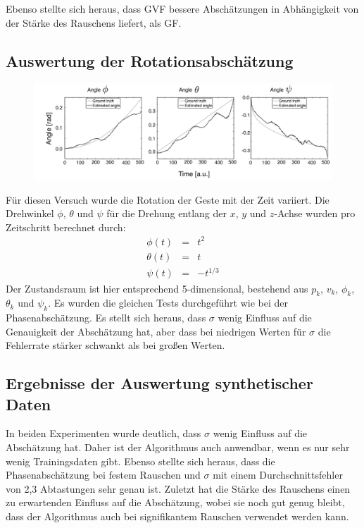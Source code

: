 \documentclass{llncs}
\begin{document}
Ebenso stellte sich heraus, dass GVF bessere Abschätzungen in Abhängigkeit von der Stärke des Rauschens liefert, als GF.

\subsection{Auswertung der Rotationsabschätzung}
\begin{figure}
\centering
\includegraphics[width=0.7\linewidth]{../Bilder/Fig8}
\caption{}
\label{fig:Fig8}
\end{figure}
Für diesen Versuch wurde die Rotation der Geste mit der Zeit variiert. Die Drehwinkel $\phi$, $\theta$ und $\psi$ für die Drehung entlang der $x$, $y$ und $z$-Achse wurden pro Zeitschritt berechnet durch:
\begin{equation}
\begin{array}{rcl}
\phi(t) & = & t^2\\
\theta(t) & = & t\\
\psi(t) & = & -t^{1/3}
\end{array}
\end{equation}
Der Zustandsraum ist hier entsprechend 5-dimensional, bestehend aus $p_k$, $v_k$, $\phi_k$, $\theta_k$ und $\psi_k$. Es wurden die gleichen Tests durchgeführt wie bei der Phasenabschätzung.
Es stellt sich heraus, dass $\sigma$ wenig Einfluss auf die Genauigkeit der Abschätzung hat, aber dass bei niedrigen Werten für $\sigma$ die Fehlerrate stärker schwankt als bei großen Werten.

\subsection{Ergebnisse der Auswertung synthetischer Daten}
In beiden Experimenten wurde deutlich, dass $\sigma$ wenig Einfluss auf die Abschätzung hat. Daher ist der Algorithmus auch anwendbar, wenn es nur sehr wenig Trainingsdaten gibt. Ebenso stellte sich heraus, dass die Phasenabschätzung bei festem Rauschen und $\sigma$ mit einem Durchschnittsfehler von 2,3 Abtastungen sehr genau ist. Zuletzt hat die Stärke des Rauschens einen zu erwartenden Einfluss auf die Abschätzung, wobei sie noch gut genug bleibt, dass der Algorithmus auch bei signifikantem Rauschen verwendet werden kann.
\end{document}
